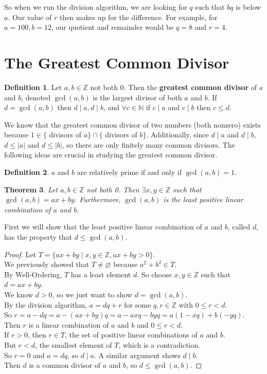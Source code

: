 \documentclass[11pt]{amsart}
\newtheorem{theorem}{Theorem}[section]
\theoremstyle{definition}
\newtheorem{definition}[theorem]{Definition}
\newcommand{\integers}{\mathbb{Z}}
\newcommand{\naturals}{\mathbb{N}}
\let\emptyset\varnothing
\begin{document}
So when we run the division algorithm, we are looking for $q$ such that $bq$ is below $a$. Our value of $r$ then makes up for the difference.
For example, for $a = 100, b = 12$, our quotient and remainder would be $q = 8$ and $r = 4$.

\newpage
\section{The Greatest Common Divisor}
\begin{definition}
	Let $a, b \in \integers$ not both 0. Then the \textbf{greatest common divisor} of $a$ and $b$, denoted $\gcd(a,b)$ is the largest divisor of
	both $a$ and $b$. If $d = \gcd(a, b)$ then $d \mid a, d \mid b$, and $\forall c \in \naturals$ if $c \mid a$ and $c \mid b$ then $c \leq d$.
\end{definition}
We know that the greatest common divisor of two numbers (both nonzero) exists because $1 \in \{$ divisors of $a \} \cap \{$ divisors of $b \}$.
Additionally, since $d \mid a$ and $d \mid b$, $d \leq |a|$ and $d \leq |b|$, so there are only finitely many common divisors. The following ideas
are crucial in studying the greatest common divisor.
\begin{definition}
	$a$ and $b$ are relatively prime if and only if $\gcd(a, b) = 1$.
\end{definition}
\begin{theorem}
	Let $a, b \in \integers$ not both 0. Then $\exists x, y \in \integers$ such that $\gcd(a, b) = ax + by$. Furthermore, $\gcd(a, b)$ is the least
	positive linear combination of $a$ and $b$.
\end{theorem}
First we will show that the least positive linear combination of $a$ and $b$, called $d$, has the property that $d \leq \gcd(a, b)$.
\begin{proof}
	Let $T = \{ ax + by \mid x, y \in \integers, ax + by > 0 \}$. \\
	We previously showed that $T \neq \emptyset$ because $a^2 + b^2 \in T$. \\
	By Well-Ordering, $T$ has a least element $d$. So choose $x, y \in \integers$ such that $d = ax + by$. \\
	We know $d > 0$, so we just want to show $d = \gcd(a, b)$. \\
	By the division algorithm, $a = dq + r$ for some $q, r \in \integers$ with $0 \leq r < d$. \\
	So $r = a - dq = a - (ax + by)q = a - axq - byq = a(1 - xq) + b(-yq)$. \\
	Then $r$ is a linear combination of $a$ and $b$ and $0 \leq r < d$. \\
	If $r > 0$, then $r \in T$, the set of positive linear combinations of $a$ and $b$. \\
	But $r < d$, the smallest element of $T$, which is a contradiction. \\
	So $r = 0$ and $a = dq$, so $d \mid a$. A similar argument shows $d \mid b$. \\
	Then $d$ is a common divisor of $a$ and $b$, so $d \leq \gcd(a, b)$.
\end{proof}
\end{document}

